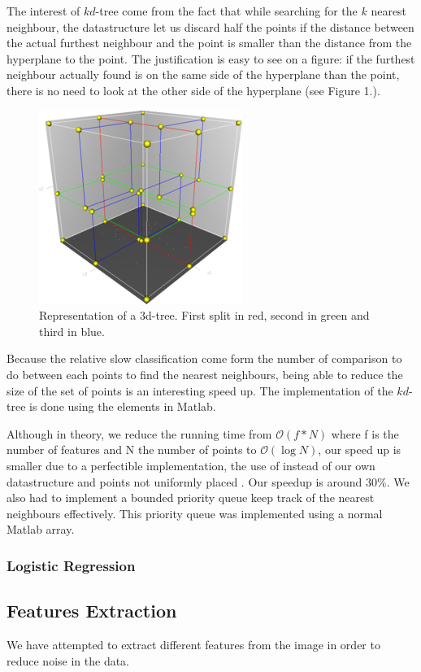 \documentclass{article} %
\begin{document}
The interest of $kd$-tree come from the fact that while searching for the $k$ nearest neighbour, the datastructure let us discard half the points if the distance between the actual furthest neighbour and the point is smaller than the distance from the hyperplane to the point. The justification is easy to see on a figure: if the furthest neighbour actually found is on the same side of the hyperplane than the point, there is no need to look at the other side of the hyperplane (see Figure 1.).
\begin{figure}
\centering
\includegraphics{3dtree.png}
\caption{Representation of a $3$d-tree. First split in red, second in green and third in blue.}
\end{figure}
Because the relative slow classification come form the number of comparison to do between each points to find the nearest neighbours, being able to reduce the size of the set of points is an interesting speed up. The implementation of the $kd$-tree is done using the  elements in Matlab. 

Although in theory, we reduce the running time from $\mathcal{O}(f*N)$ where f is the number of features and N the number of points to $\mathcal{O}(\log{}N)$, our speed up is smaller due to a perfectible implementation, the use of  instead of our own datastructure and points not uniformly placed . Our speedup is around $30$\%.
We also had to implement a bounded priority queue keep track of the nearest neighbours effectively. This priority queue was implemented using a normal Matlab array.




\subsubsection{Logistic Regression}


\subsection{Features Extraction}
We have attempted to extract different features from the image in order to reduce noise in the data.
\end{document}
